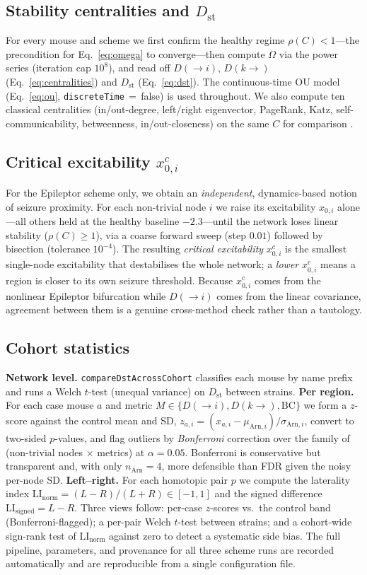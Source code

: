 \documentclass[11pt,a4paper]{article}
\newcommand{\Dst}{D_{\mathrm{st}}}
\newcommand{\Dto}{D(\!\to\! i)}
\newcommand{\Dfrom}{D(k\!\to\!)}
\newcommand{\rhoC}{\rho(C)}
\newcommand{\xcrit}{x_{0,i}^{c}}
\begin{document}
\subsection{Stability centralities and $\Dst$}
For every mouse and scheme we first confirm the healthy regime $\rhoC<1$---the precondition for
Eq.~\eqref{eq:omega} to converge---then compute $\Omega$ via the power series (iteration cap
$10^8$), and read off $\Dto$, $\Dfrom$ (Eq.~\eqref{eq:centralities}) and $\Dst$ (Eq.~\eqref{eq:dst}).
The continuous-time OU model (Eq.~\eqref{eq:ou}, \texttt{discreteTime}\,$=$\,false) is used
throughout. We also compute ten classical centralities (in/out-degree, left/right eigenvector,
PageRank, Katz, self-communicability, betweenness, in/out-closeness) on the same $C$ for comparison
\citep{rubinov2010}.

\subsection{Critical excitability $\xcrit$}
\label{sec:x0}
For the Epileptor scheme only, we obtain an \emph{independent}, dynamics-based notion of seizure
proximity. For each non-trivial node $i$ we raise its excitability $x_{0,i}$ alone---all others held
at the healthy baseline $-2.3$---until the network loses linear stability ($\rhoC\ge 1$), via a
coarse forward sweep (step $0.01$) followed by bisection (tolerance $10^{-4}$). The resulting
\emph{critical excitability} $\xcrit$ is the smallest single-node excitability that destabilises the
whole network; a \emph{lower} $\xcrit$ means a region is closer to its own seizure threshold. Because
$\xcrit$ comes from the nonlinear Epileptor bifurcation while $\Dto$ comes from the linear covariance,
agreement between them is a genuine cross-method check rather than a tautology.

\subsection{Cohort statistics}
\textbf{Network level.} \texttt{compareDstAcrossCohort} classifies each mouse by name prefix and runs a
Welch $t$-test (unequal variance) on $\Dst$ between strains.
\textbf{Per region.} For each case mouse $a$ and metric $M\in\{\Dto,\Dfrom,\mathrm{BC}\}$ we form a
$z$-score against the control mean and SD,
$z_{a,i}=(x_{a,i}-\mu_{\mathrm{Arn},i})/\sigma_{\mathrm{Arn},i}$, convert to two-sided $p$-values, and
flag outliers by \emph{Bonferroni} correction over the family of (non-trivial nodes $\times$ metrics)
at $\alpha=0.05$. Bonferroni is conservative but transparent and, with only $n_{\mathrm{Arn}}=4$, more
defensible than FDR given the noisy per-node SD.
\textbf{Left--right.} For each homotopic pair $p$ we compute the laterality index
$\mathrm{LI}_{\mathrm{norm}}=(L-R)/(L+R)\in[-1,1]$ and the signed difference $\mathrm{LI}_{\mathrm{signed}}=L-R$.
Three views follow: per-case $z$-scores vs.\ the control band (Bonferroni-flagged); a per-pair Welch
$t$-test between strains; and a cohort-wide sign-rank test of $\mathrm{LI}_{\mathrm{norm}}$ against
zero to detect a systematic side bias. The full pipeline, parameters, and provenance for all three
scheme runs are recorded automatically and are reproducible from a single configuration file.
\end{document}
